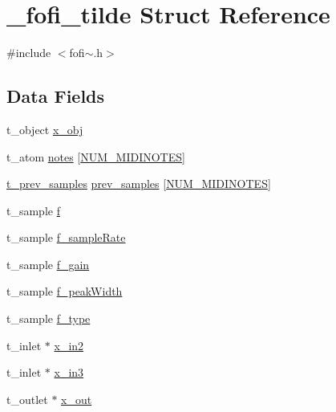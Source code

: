 \hypertarget{struct__fofi__tilde}{}\section{\+\_\+fofi\+\_\+tilde Struct Reference}
\label{struct__fofi__tilde}


{\ttfamily \#include $<$fofi$\sim$.\+h$>$}

\subsection*{Data Fields}
\begin{DoxyCompactItemize}
\item 
t\+\_\+object \mbox{\hyperlink{struct__fofi__tilde_a1f651402d2c0639cd164d6b3d984a5c1}{x\+\_\+obj}}
\item 
t\+\_\+atom \mbox{\hyperlink{struct__fofi__tilde_a19888916f4cb842a3df03aaaacae812e}{notes}} \mbox{[}\mbox{\hyperlink{fofi~_8h_ae3ab4a4583b2509064f2fbafe7a1f8b0}{N\+U\+M\+\_\+\+M\+I\+D\+I\+N\+O\+T\+ES}}\mbox{]}
\item 
\mbox{\hyperlink{fofi~_8h_a728138bbe23514a1927f1f686090cd52}{t\+\_\+prev\+\_\+samples}} \mbox{\hyperlink{struct__fofi__tilde_a20d97ab99b35909dcf2a51b292c39a33}{prev\+\_\+samples}} \mbox{[}\mbox{\hyperlink{fofi~_8h_ae3ab4a4583b2509064f2fbafe7a1f8b0}{N\+U\+M\+\_\+\+M\+I\+D\+I\+N\+O\+T\+ES}}\mbox{]}
\item 
t\+\_\+sample \mbox{\hyperlink{struct__fofi__tilde_ae59a31f6fe658e56a45e39ba4718cf47}{f}}
\item 
t\+\_\+sample \mbox{\hyperlink{struct__fofi__tilde_a7434f573cf65bb5167a3ee26ee485abf}{f\+\_\+sample\+Rate}}
\item 
t\+\_\+sample \mbox{\hyperlink{struct__fofi__tilde_af4ec7786674213b45c30b547f0f2a2ba}{f\+\_\+gain}}
\item 
t\+\_\+sample \mbox{\hyperlink{struct__fofi__tilde_a7ffaace888f4bfdfc36150731c79fb98}{f\+\_\+peak\+Width}}
\item 
t\+\_\+sample \mbox{\hyperlink{struct__fofi__tilde_a1f826f040d78942f1cb95b2c903bd36d}{f\+\_\+type}}
\item 
t\+\_\+inlet $\ast$ \mbox{\hyperlink{struct__fofi__tilde_a97f9021a0fee597ec4a100473f7aafd3}{x\+\_\+in2}}
\item 
t\+\_\+inlet $\ast$ \mbox{\hyperlink{struct__fofi__tilde_a243e1b723c18fb1bb57ecfbc1c5b84f6}{x\+\_\+in3}}
\item 
t\+\_\+outlet $\ast$ \mbox{\hyperlink{struct__fofi__tilde_a5cdfe16a03a81e1ffb3bb60ab0e92eca}{x\+\_\+out}}
\end{DoxyCompactItemize}


